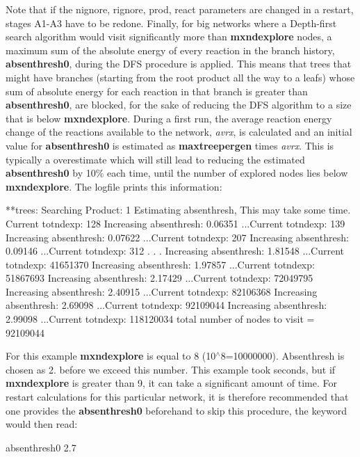 Note that if the nignore, rignore, prod, react parameters are changed in a restart, stages A1-\/\+A3 have to be redone. Finally, for big networks where a Depth-\/first search algorithm would visit significantly more than {\bfseries mxndexplore} nodes, a maximum sum of the absolute energy of every reaction in the branch history, {\bfseries absenthresh0}, during the D\+FS procedure is applied. This means that trees that might have branches (starting from the root product all the way to a leafs) whose sum of absolute energy for each reaction in that branch is greater than {\bfseries absenthresh0}, are blocked, for the sake of reducing the D\+FS algorithm to a size that is below {\bfseries mxndexplore}. During a first run, the average reaction energy change of the reactions available to the network, {\itshape avrx}, is calculated and an initial value for {\bfseries absenthresh0} is estimated as {\bfseries maxtreepergen} times {\itshape avrx}. This is typically a overestimate which will still lead to reducing the estimated {\bfseries absenthresh0} by 10\% each time, until the number of explored nodes lies below {\bfseries mxndexplore}. The logfile prints this information\+: \begin{DoxyVerb}**trees: Searching Product:     1
Estimating absenthresh, This may take some time. Current totndexp:         128
Increasing absenthresh: 0.06351 ...Current totndexp:         139
Increasing absenthresh: 0.07622 ...Current totndexp:         207
Increasing absenthresh: 0.09146 ...Current totndexp:         312
                    .
                    .
                    .
Increasing absenthresh: 1.81548 ...Current totndexp:    41651370
Increasing absenthresh: 1.97857 ...Current totndexp:    51867693
Increasing absenthresh: 2.17429 ...Current totndexp:    72049795
Increasing absenthresh: 2.40915 ...Current totndexp:    82106368
Increasing absenthresh: 2.69098 ...Current totndexp:    92109044
Increasing absenthresh: 2.99098 ...Current totndexp:   118120034
total number of nodes to visit =    92109044
\end{DoxyVerb}


For this example {\bfseries mxndexplore} is equal to 8 (10$^\wedge$8=10000000). Absenthresh is chosen as 2. before we exceed this number. This example took seconds, but if {\bfseries mxndexplore} is greater than 9, it can take a significant amount of time. For restart calculations for this particular network, it is therefore recommended that one provides the {\bfseries absenthresh0} beforehand to skip this procedure, the keyword would then read\+: \begin{DoxyVerb}absenthresh0 2.7
\end{DoxyVerb}


